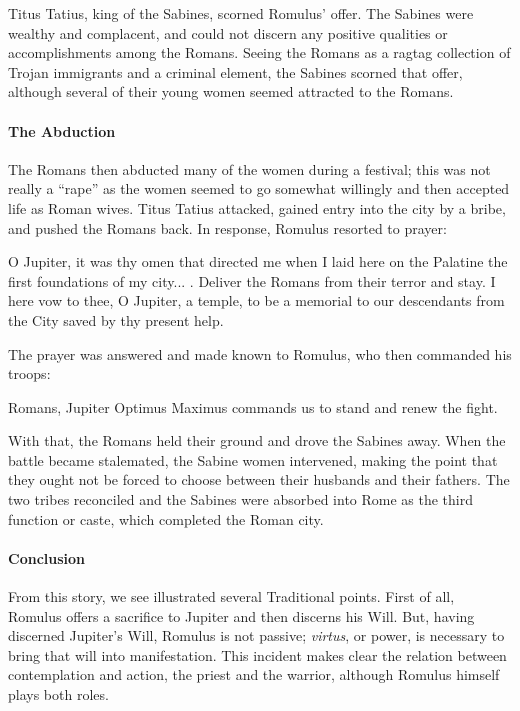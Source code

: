 Titus Tatius, king of the Sabines, scorned Romulus' offer. The Sabines were wealthy and complacent, and could not discern any positive qualities or accomplishments among the Romans. Seeing the Romans as a ragtag collection of Trojan immigrants and a criminal element, the Sabines scorned that offer, although several of their young women seemed attracted to the Romans.

\paragraph{The Abduction}


The Romans then abducted many of the women during a festival; this was not really a ``rape'' as the women seemed to go somewhat willingly and then accepted life as Roman wives. Titus Tatius attacked, gained entry into the city by a bribe, and pushed the Romans back. In response, Romulus resorted to prayer:

\begin{quotex}
O Jupiter, it was thy omen that directed me when I laid here on the Palatine the first foundations of my city... . Deliver the Romans from their terror and stay. I here vow to thee, O Jupiter, a temple, to be a memorial to our descendants from the City saved by thy present help.
\end{quotex}


The prayer was answered and made known to Romulus, who then commanded his troops:

\begin{quotex}
Romans, Jupiter Optimus Maximus commands us to stand and renew the fight.
\end{quotex}


With that, the Romans held their ground and drove the Sabines away. When the battle became stalemated, the Sabine women intervened, making the point that they ought not be forced to choose between their husbands and their fathers. The two tribes reconciled and the Sabines were absorbed into Rome as the third function or caste, which completed the Roman city.

\paragraph{Conclusion}


From this story, we see illustrated several Traditional points. First of all, Romulus offers a sacrifice to Jupiter and then discerns his Will. But, having discerned Jupiter's Will, Romulus is not passive; \emph{virtus}, or power, is necessary to bring that will into manifestation. This incident makes clear the relation between contemplation and action, the priest and the warrior, although Romulus himself plays both roles.

